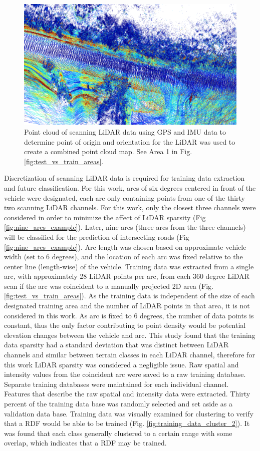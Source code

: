 \documentclass[journal,onecolumn]{IEEEtran}
\begin{document}
			\begin{figure}[H]
				\centering
				\includegraphics[width=0.75\linewidth]{figures/combined_pcd_example}
				\caption[Aggregated Point Cloud Data]{Point cloud of scanning LiDAR data using GPS and IMU data to determine point of origin and orientation for the LiDAR was used to create a combined point cloud map. See Area 1 in Fig. \ref{fig:test_vs_train_areas}.}
				\label{fig:pc_example}
			\end{figure}
		
			{Discretization of scanning LiDAR data is required for training data extraction and future classification. For this work, arcs of six degrees centered in front of the vehicle were designated, each arc only containing points from one of the thirty two scanning LiDAR channels. For this work, only the closest three channels were considered in order to minimize the affect of LiDAR sparsity (Fig \ref{fig:nine_arcs_example}). Later, nine arcs (three arcs from the three channels) will be classified for the prediction of intersecting roads (Fig \ref{fig:nine_arcs_example}). Arc length was chosen based on approximate vehicle width (set to 6 degrees), and the location of each arc was fixed relative to the center line (length-wise) of the vehicle. Training data was extracted from a single arc, with approximately 28 LiDAR points per arc, from each 360 degree LiDAR scan if the arc was coincident to a manually projected 2D area (Fig. \ref{fig:test_vs_train_areas}). As the training data is independent of the size of each designated training area and the number of LiDAR points in that area, it is not considered in this work. As arc is fixed to 6 degrees, the number of data points is constant, thus the only factor contributing to point density would be potential elevation changes between the vehicle and arc. This study found that the training data sparsity had a standard deviation that was distinct between LiDAR channels and similar between terrain classes in each LiDAR channel, therefore for this work LiDAR sparsity was considered a negligible issue. Raw spatial and intensity values from the coincident arc were saved to a raw training database. Separate training databases were maintained for each individual channel. Features that describe the raw spatial and intensity data were extracted. Thirty percent of the training data base was randomly selected and set aside as a validation data base. Training data was visually examined for clustering to verify that a RDF would be able to be trained (Fig. \ref{fig:training_data_cluster_2}). It was found that each class generally clustered to a certain range with some overlap, which indicates that a RDF may be trained. }
			
\end{document}
